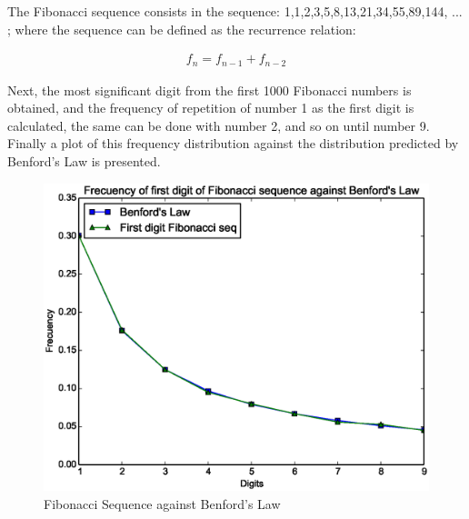 The Fibonacci sequence consists in the sequence: 1,1,2,3,5,8,13,21,34,55,89,144, ... ; where the sequence can be defined as the recurrence relation:

\begin{align*} f_n=f_{n-1}+f_{n-2}\end{align*}

Next, the most significant digit from the first 1000 Fibonacci numbers is obtained, and the frequency of repetition of number 1 as the first digit is calculated, the same can be done with number 2, and so on until number 9. Finally a plot of this frequency distribution against the distribution predicted by Benford's Law is presented.


\begin{figure}[h]
\centering
\includegraphics[scale=0.5]{imagenes/2-benford/benford_ex1}
\caption{Fibonacci Sequence against Benford's Law}
\end{figure}
